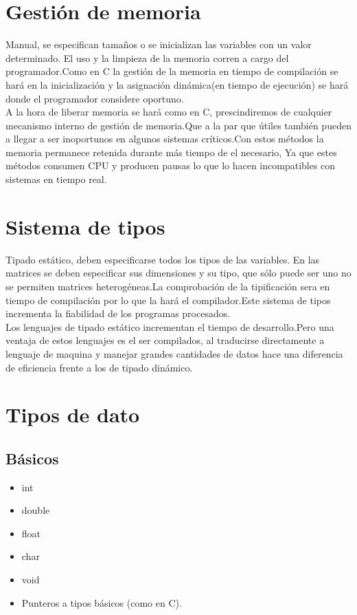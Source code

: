 \documentclass[12pt,a4paper]{article}
\begin{document}
\section{Gestión de memoria}
Manual, se especifican tamaños o se inicializan las variables con un valor
determinado. El uso y la limpieza de la memoria corren a cargo del programador.Como en C la gestión de la memoria en tiempo de compilación se hará en la inicialización y la asignación dinámica(en tiempo de ejecución) se hará donde el programador considere oportuno.\\
A la hora de liberar memoria se hará como en C, prescindiremos de cualquier mecanismo interno de gestión de memoria.Que a la par que útiles también pueden a llegar a ser inoportunos en algunos sistemas críticos.Con estos métodos la memoria permanece retenida durante más tiempo de el necesario, Ya que estes métodos consumen CPU y producen pausas lo que lo hacen incompatibles con sistemas en tiempo real.
\section{Sistema de tipos}
Tipado estático, deben especificarse todos los tipos de las variables. En las
matrices se deben especificar sus dimensiones y su tipo, que sólo puede ser uno
no se permiten matrices heterogéneas.La comprobación de la tipificación sera en tiempo de compilación por lo que la hará el compilador.Este sistema de tipos incrementa la fiabilidad de los programas procesados.\\
Los lenguajes de tipado estático incrementan el tiempo de desarrollo.Pero una ventaja de estos lenguajes es el ser compilados, al traducirse directamente a lenguaje de maquina y manejar grandes cantidades de datos hace una diferencia de eficiencia frente a los de tipado dinámico.
\section{Tipos de dato}
\subsection{Básicos}
\begin{itemize}
\item int
\item double
\item float
\item char
\item void
\item Punteros a tipos básicos (como en C).
\end{itemize}
\end{document}
